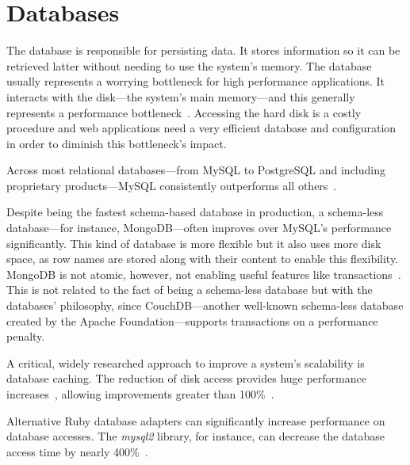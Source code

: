 \section{Databases} %
\label{state:sec:databases}
The database is responsible for persisting data. It stores information so it can be retrieved latter without needing to use the system's memory.
The database usually represents a worrying bottleneck for high performance applications. It interacts with the disk---the system's main memory---and this generally represents a performance bottleneck~\cite{memory_wall}. Accessing the hard disk is a costly procedure and web applications need a very efficient database and configuration in order to diminish this bottleneck's impact.

Across most relational databases---from MySQL to PostgreSQL and including proprietary products---MySQL consistently outperforms all others~\cite{benchmark_relational_databases}.

Despite being the fastest schema-based database in production, a schema-less database---for instance, MongoDB---often improves over MySQL's performance significantly. This kind of database is more flexible but it also uses more disk space, as row names are stored along with their content to enable this flexibility. MongoDB is not atomic, however, not enabling useful features like transactions~\cite{mysql_to_mongodb}. This is not related to the fact of being a schema-less database but with the databases' philosophy, since CouchDB---another well-known schema-less database created by the Apache Foundation---supports transactions on a performance penalty.

A critical, widely researched approach to improve a system's scalability is database caching. The reduction of disk access provides huge performance increases~\cite{scaling_rails_bottomup}, allowing improvements greater than 100\%~\cite{rapid_prototyping_mdd,high_performance_database_caching}.

Alternative Ruby database adapters can significantly increase performance on database accesses. The \textit{mysql2} library, for instance, can decrease the database access time by nearly 400\%~\cite{brianmario_mysql2}.

